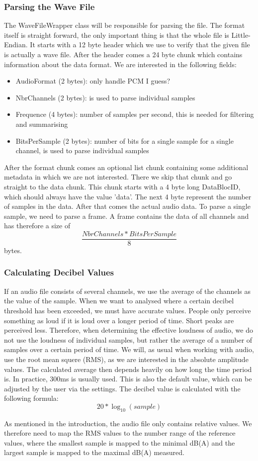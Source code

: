 \subsubsection{Parsing the Wave File}
The WaveFileWrapper class will be responsible for parsing the file. The format itself is straight forward\cite{wav_file_format_wikipedia}, the only important thing is that the whole file is Little-Endian. It starts with a 12 byte header which we use to verify that the given file is actually a wave file. After the header comes a 24 byte chunk which contains information about the data format. We are interested in the following fields:
\begin{itemize}
    \item AudioFormat (2 bytes): only handle PCM I guess?
    \item NbrChannels (2 bytes): is used to parse individual samples
    \item Frequence (4 bytes): number of samples per second, this is needed for filtering and summarising
    \item BitsPerSample (2 bytes): number of bits for a single sample for a single channel, is used to parse individual samples
\end{itemize}
After the format chunk comes an optional list chunk containing some additional metadata in which we are not interested. There we skip that chunk and go straight to the data chunk. This chunk starts with a 4 byte long DataBlocID, which should always have the value 'data'. The next 4 byte represent the number of samples in the data. After that comes the actual audio data. To parse a single sample, we need to parse a frame. A frame contains the data of all channels and has therefore a size of \[\frac{NbrChannels * BitsPerSample}{8}\] bytes.

\subsubsection{Calculating Decibel Values}
If an audio file consists of several channels, we use the average of the channels as the value of the sample.
When we want to analysed where a certain decibel threshold has been exceeded, we must have accurate values. People only perceive something as loud if it is loud over a longer period of time. Short peaks are perceived less. Therefore, when determining the effective loudness of audio, we do not use the loudness of individual samples, but rather the average of a number of samples over a certain period of time. We will, as usual when working with audio, use the root mean squere (RMS), as we are interested in the absolute amplitude values.
The calculated average then depends heavily on how long the time period is. In practice, 300ms is usually used\cite{timespan_for_audio_rms_calculate}. This is also the default value, which can be adjusted by the user via the settings.
The decibel value is calculated with the following formula\cite{decibel_wikipedia}:
\[20 * \log_{10} (sample)\]

As mentioned in the introduction, the audio file only contains relative values. We therefore need to map the RMS values to the number range of the reference values, where the smallest sample is mapped to the minimal dB(A) and the largest sample is mapped to the maximal dB(A) measured.
